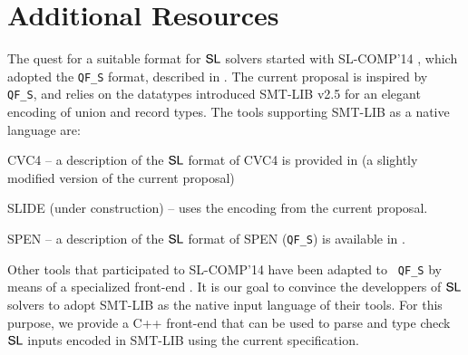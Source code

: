 \documentclass{llncs}
\begin{document}
\section{Additional Resources}

The quest for a suitable format for $\mathsf{SL}$ solvers started with
SL-COMP'14 \cite{sl-comp14}, which adopted the {\tt QF\_S} format,
described in \cite{qfs}. The current proposal is inspired by {\tt
  QF\_S}, and relies on the datatypes introduced SMT-LIB v2.5 for an
elegant encoding of union and record types. The tools supporting
SMT-LIB as a native language are: \begin{compactitem}
\item CVC4 \cite{ReynoldsIosifKingSerban16} -- a description of the $\mathsf{SL}$
  format of CVC4 is provided in \cite{cvc4-seplog} (a slightly
  modified version of the current proposal)
\item SLIDE (under construction) -- uses the encoding from the current
  proposal.
\item SPEN \cite{spen} -- a description of the $\mathsf{SL}$
  format of SPEN ({\tt QF\_S}) is available in \cite{qfs}.
\end{compactitem} 
Other tools that participated to SL-COMP'14 have been adapted to {\tt
  QF\_S} by means of a specialized front-end \cite{qfs-frontend}. It
is our goal to convince the developpers of $\mathsf{SL}$ solvers to adopt
SMT-LIB as the native input language of their tools. For this purpose,
we provide a C++ front-end \cite{smtlib-frontend} that can be used to
parse and type check $\mathsf{SL}$ inputs encoded in SMT-LIB using the
current specification.

 


\end{document}

